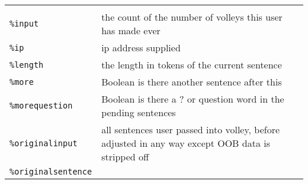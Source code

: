 \documentclass[]{article}
\begin{document}
\begin{longtable}[]{@{}ll@{}}
\begin{minipage}[t]{0.10\columnwidth}
\end{minipage}\tabularnewline
\begin{minipage}[t]{0.12\columnwidth}\raggedright\strut
\texttt{\%input}\strut
\end{minipage} & \begin{minipage}[t]{0.10\columnwidth}\raggedright\strut
the count of the number of volleys this user has made ever\strut
\end{minipage}\tabularnewline
\begin{minipage}[t]{0.12\columnwidth}\raggedright\strut
\texttt{\%ip}\strut
\end{minipage} & \begin{minipage}[t]{0.10\columnwidth}\raggedright\strut
ip address supplied\strut
\end{minipage}\tabularnewline
\begin{minipage}[t]{0.12\columnwidth}\raggedright\strut
\texttt{\%length}\strut
\end{minipage} & \begin{minipage}[t]{0.10\columnwidth}\raggedright\strut
the length in tokens of the current sentence\strut
\end{minipage}\tabularnewline
\begin{minipage}[t]{0.12\columnwidth}\raggedright\strut
\texttt{\%more}\strut
\end{minipage} & \begin{minipage}[t]{0.10\columnwidth}\raggedright\strut
Boolean is there another sentence after this\strut
\end{minipage}\tabularnewline
\begin{minipage}[t]{0.12\columnwidth}\raggedright\strut
\texttt{\%morequestion}\strut
\end{minipage} & \begin{minipage}[t]{0.10\columnwidth}\raggedright\strut
Boolean is there a ? or question word in the pending sentences\strut
\end{minipage}\tabularnewline
\begin{minipage}[t]{0.12\columnwidth}\raggedright\strut
\texttt{\%originalinput}\strut
\end{minipage} & \begin{minipage}[t]{0.10\columnwidth}\raggedright\strut
all sentences user passed into volley, before adjusted in any way except
OOB data is stripped off\strut
\end{minipage}\tabularnewline
\begin{minipage}[t]{0.12\columnwidth}\raggedright\strut
\texttt{\%originalsentence}\strut

\end{minipage}
\end{longtable}
\end{document}
